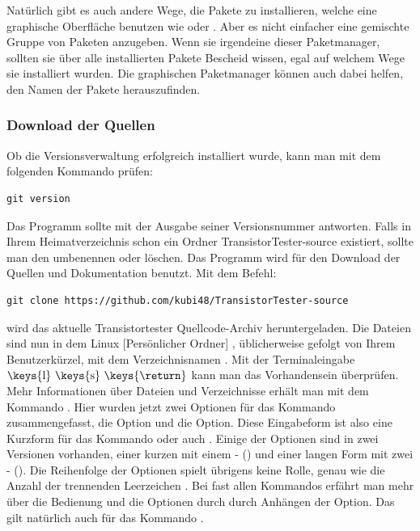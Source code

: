 Natürlich gibt es auch andere Wege, die Pakete zu installieren, welche eine graphische Oberfläche benutzen
wie  oder . Aber es nicht einfacher eine gemischte Gruppe von Paketen anzugeben.
Wenn sie irgendeine dieser Paketmanager, sollten sie über alle installierten Pakete Bescheid wissen,
egal auf welchem Wege sie installiert wurden.
Die graphischen Paketmanager können auch dabei helfen, den Namen der Pakete herauszufinden.

\subsubsection{Download der Quellen}

Ob die Versionsverwaltung  erfolgreich installiert wurde,
kann man mit dem folgenden Kommando prüfen:
\begin{large} \vspace{-0.4em} \begin{verbatim}
git version
\end{verbatim} \end{large}
Das  Programm sollte mit der Ausgabe seiner Versionsnummer antworten.
Falls in Ihrem Heimatverzeichnis schon ein Ordner TransistorTester-source existiert,
sollte man den umbenennen oder löschen.
Das Programm  wird für den Download der Quellen und Dokumentation benutzt.
Mit dem Befehl:
\begin{large} \vspace{-0.4em} \begin{verbatim}
git clone https://github.com/kubi48/TransistorTester-source
\end{verbatim} \end{large}
wird das aktuelle Transistortester Quellcode-Archiv heruntergeladen.
Die Dateien sind nun in dem Linux [Persönlicher Ordner] , üblicherweise  gefolgt
von Ihrem Benutzerkürzel, mit dem  Verzeichnisnamen .
Mit der Terminaleingabe   \(\mbox{\keys{l} \keys{s} \keys{\return}}\) kann man
das Vorhandensein überprüfen.
Mehr Informationen über Dateien und Verzeichnisse erhält man mit
dem Kommando . Hier wurden jetzt zwei Optionen für das Kommando  zusammengefasst,
die  Option und die  Option. Diese Eingabeform ist also eine Kurzform für
das Kommando  oder auch .
Einige der Optionen sind in zwei Versionen vorhanden, einer kurzen mit einem - ()
und einer langen Form mit zwei - ().
Die Reihenfolge der Optionen spielt übrigens keine Rolle,
genau wie die Anzahl der trennenden Leerzeichen \keys{\space}.
Bei fast allen Kommandos erfährt man mehr über die Bedienung und die Optionen
durch durch Anhängen der  Option.
Das gilt natürlich auch für das Kommando .\\

